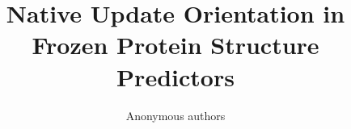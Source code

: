 \documentclass{article}
\title{Native Update Orientation in Frozen Protein Structure Predictors}
\author{Anonymous authors}
\begin{document}
\maketitle








\label{sec:main_text_end}





\clearpage
\appendix

\end{document}
